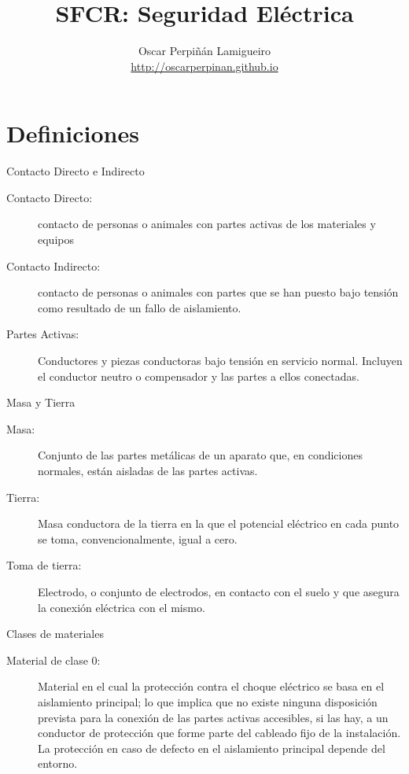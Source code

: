 \documentclass[xcolor={usenames,svgnames,dvipsnames}]{beamer}
\author{Oscar Perpiñán Lamigueiro \\ \url{http://oscarperpinan.github.io}}
\date{}
\title{SFCR: Seguridad Eléctrica}
\begin{document}
\maketitle


\section{Definiciones}
\label{sec-1}

\begin{frame}[label=sec-1-0-1]{Contacto Directo e Indirecto}
\begin{description}
\item[{Contacto Directo:}] contacto de personas o animales con partes
activas de los materiales y equipos

\item[{Contacto Indirecto:}] contacto de personas o animales con partes que
se han puesto bajo tensión como resultado de un fallo de aislamiento.

\item[{Partes Activas:}] Conductores y piezas conductoras bajo tensión en
servicio normal. Incluyen el conductor neutro o compensador y las
partes a ellos conectadas.
\end{description}
\end{frame}

\begin{frame}[label=sec-1-0-2]{Masa y Tierra}
\begin{description}
\item[{Masa:}] Conjunto de las partes metálicas de un aparato que, en
condiciones normales, están aisladas de las partes activas.

\item[{Tierra:}] Masa conductora de la tierra en la que el potencial
eléctrico en cada punto se toma, convencionalmente, igual a cero.

\item[{Toma de tierra:}] Electrodo, o conjunto de electrodos, en contacto
con el suelo y que asegura la conexión eléctrica con el mismo.
\end{description}
\end{frame}

\begin{frame}[label=sec-1-0-3]{Clases de materiales}
\begin{description}
\item[{Material de clase 0:}] Material en el cual la protección contra el
choque eléctrico se basa en el aislamiento principal; lo que implica
que no existe ninguna disposición prevista para la conexión de las
partes activas accesibles, si las hay, a un conductor de protección
que forme parte del cableado fijo de la instalación. La protección en
caso de defecto en el aislamiento principal depende del entorno.
\end{description}
\end{frame}
\end{document}

